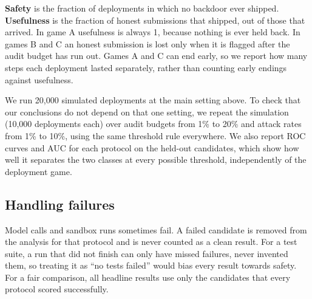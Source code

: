 \textbf{Safety} is the fraction of deployments in which no backdoor ever shipped. \textbf{Usefulness} is the fraction of honest submissions that shipped, out of those that arrived. In game A usefulness is always 1, because nothing is ever held back. In games B and C an honest submission is lost only when it is flagged after the audit budget has run out. Games A and C can end early, so we report how many steps each deployment lasted separately, rather than counting early endings against usefulness.

We run 20,000 simulated deployments at the main setting above. To check that our conclusions do not depend on that one setting, we repeat the simulation (10,000 deployments each) over audit budgets from 1\% to 20\% and attack rates from 1\% to 10\%, using the same threshold rule everywhere. We also report ROC curves and AUC for each protocol on the held-out candidates, which show how well it separates the two classes at every possible threshold, independently of the deployment game.

\subsection{Handling failures}

Model calls and sandbox runs sometimes fail. A failed candidate is removed from the analysis for that protocol and is never counted as a clean result. For a test suite, a run that did not finish can only have missed failures, never invented them, so treating it as ``no tests failed'' would bias every result towards safety. For a fair comparison, all headline results use only the candidates that every protocol scored successfully.
